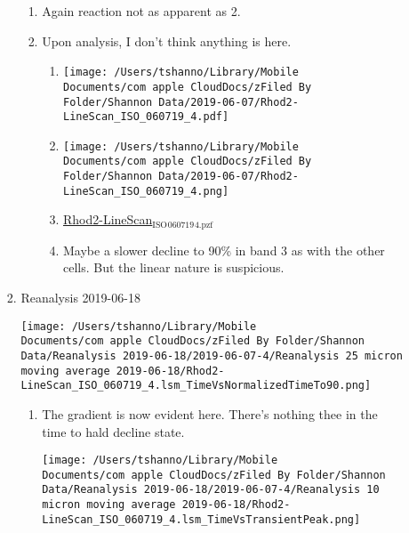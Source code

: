 \documentclass[11pt]{article}
\begin{document}
\begin{enumerate}
\begin{enumerate}
\begin{enumerate}
\begin{center}
\end{center}
\begin{enumerate}
\item Again reaction not as apparent as 2.
\label{sec:orgbf16688}
\item Upon analysis, I don't think anything is here.
\label{sec:org2641cec}
\begin{enumerate}
\item \begin{center}
\texttt{[image: /Users/tshanno/Library/Mobile Documents/com~apple~CloudDocs/zFiled By Folder/Shannon Data/2019-06-07/Rhod2-LineScan\_ISO\_060719\_4.pdf]}
\end{center}
\label{sec:org56521cc}
\item \begin{center}
\texttt{[image: /Users/tshanno/Library/Mobile Documents/com~apple~CloudDocs/zFiled By Folder/Shannon Data/2019-06-07/Rhod2-LineScan\_ISO\_060719\_4.png]}
\end{center}
\label{sec:orga76e4c0}
\item \href{file:///Users/tshanno/Library/Mobile Documents/com\~apple\~CloudDocs/zFiled By Folder/Shannon Data/2019-06-07/Rhod2-LineScan\_ISO\_060719\_4.pzf}{Rhod2-LineScan\(_{\text{ISO}}\)\(_{\text{060719}}\)\(_{\text{4.pzf}}\)}
\label{sec:org4311606}
\item Maybe a slower decline to 90\% in band 3 as with the other cells.  But the linear nature is suspicious.
\label{sec:orgba6e355}
\end{enumerate}
\end{enumerate}
\item Reanalysis 2019-06-18
\label{sec:org42665a2}
\begin{center}
\texttt{[image: /Users/tshanno/Library/Mobile Documents/com~apple~CloudDocs/zFiled By Folder/Shannon Data/Reanalysis 2019-06-18/2019-06-07-4/Reanalysis 25 micron moving average 2019-06-18/Rhod2-LineScan\_ISO\_060719\_4.lsm\_TimeVsNormalizedTimeTo90.png]}
\end{center}
\begin{enumerate}
\item The gradient is now evident here.  There's nothing thee in the time to hald decline state.
\label{sec:org02eb725}
\begin{center}
\texttt{[image: /Users/tshanno/Library/Mobile Documents/com~apple~CloudDocs/zFiled By Folder/Shannon Data/Reanalysis 2019-06-18/2019-06-07-4/Reanalysis 10 micron moving average 2019-06-18/Rhod2-LineScan\_ISO\_060719\_4.lsm\_TimeVsTransientPeak.png]}

\end{center}
\end{enumerate}
\end{enumerate}
\end{enumerate}
\end{enumerate}
\end{document}
